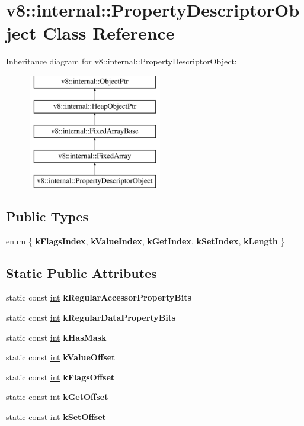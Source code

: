 \hypertarget{classv8_1_1internal_1_1PropertyDescriptorObject}{}\section{v8\+:\+:internal\+:\+:Property\+Descriptor\+Object Class Reference}
\label{classv8_1_1internal_1_1PropertyDescriptorObject}
Inheritance diagram for v8\+:\+:internal\+:\+:Property\+Descriptor\+Object\+:\begin{figure}[H]
\begin{center}
\leavevmode
\includegraphics[height=5.000000cm]{classv8_1_1internal_1_1PropertyDescriptorObject}
\end{center}
\end{figure}
\subsection*{Public Types}
\begin{DoxyCompactItemize}
\item 
\mbox{\label{classv8_1_1internal_1_1PropertyDescriptorObject_a36c82e0f34c2275c13254b20005640a4}} 
enum \{ \newline
{\bfseries k\+Flags\+Index}, 
{\bfseries k\+Value\+Index}, 
{\bfseries k\+Get\+Index}, 
{\bfseries k\+Set\+Index}, 
\newline
{\bfseries k\+Length}
 \}
\end{DoxyCompactItemize}
\subsection*{Static Public Attributes}
\begin{DoxyCompactItemize}
\item 
static const \mbox{\hyperlink{classint}{int}} {\bfseries k\+Regular\+Accessor\+Property\+Bits}
\item 
static const \mbox{\hyperlink{classint}{int}} {\bfseries k\+Regular\+Data\+Property\+Bits}
\item 
static const \mbox{\hyperlink{classint}{int}} {\bfseries k\+Has\+Mask}
\item 
static const \mbox{\hyperlink{classint}{int}} {\bfseries k\+Value\+Offset}
\item 
static const \mbox{\hyperlink{classint}{int}} {\bfseries k\+Flags\+Offset}
\item 
static const \mbox{\hyperlink{classint}{int}} {\bfseries k\+Get\+Offset}
\item 
static const \mbox{\hyperlink{classint}{int}} {\bfseries k\+Set\+Offset}
\end{DoxyCompactItemize}
